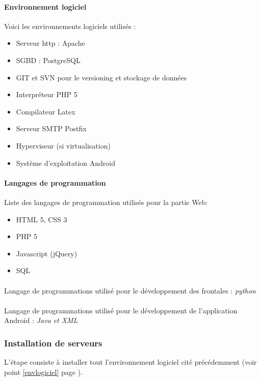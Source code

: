 \documentclass[a4paper,12pt]{article}
\begin{document}
\paragraph*{Environnement logiciel\\}
\label{envlogiciel}
Voici les environnements logiciels utilisés :
\begin{itemize}
 \item Serveur http : Apache
 \item SGBD : PostgreSQL
 \item GIT et SVN pour le versioning et stockage de données
 \item Interpréteur PHP 5  
 \item Compilateur Latex
 \item Serveur SMTP Postfix
 \item Hyperviseur (si virtualisation)
 \item Système d'exploitation Android
\end{itemize}
 

\paragraph*{Langages de programmation\\}
Liste des langages de programmation utilisés pour la partie Web:
\begin{itemize}
 \item HTML 5, CSS 3
 \item PHP 5
 \item Javascript (jQuery)
 \item SQL
\end{itemize}

\paragraph*{}
Langage de programmations utilisé pour le développement des frontales : \emph{python}

\paragraph*{}
Langage de programmations utilisé pour le développement de l'application Android : \emph{Java et XML }


\subsubsection{Installation de serveurs}
L'étape consiste à installer tout l'environnement logiciel cité précédemment (voir point \ref{envlogiciel} page \pageref{envlogiciel}). 
\end{document}
